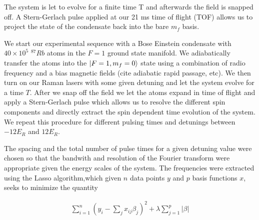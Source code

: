 The system is let to evolve for a finite time T and afterwards the field is snapped off. A Stern-Gerlach pulse applied at our 21 ms time of flight (TOF) allows us to project the state of the condensate back into the bare $m_f$ basis. 


We start our experimental sequence with a Bose Einstein condensate with $40\times 10^5$ $^{87}Rb$ atoms in the $F=1$ ground state manifold. We adiabatically transfer the atoms into the $|F=1,m_f=0\rangle$ state using a combination of radio frequency and a bias magnetic fields (cite adiabatic rapid passage, etc). We then turn on our Raman lasers with some given detuning and let the system evolve for a time $T$. After we snap off the field we let the atoms expand in time of flight and apply a Stern-Gerlach pulse which allows us to resolve the different spin components and directly extract the spin dependent time evolution of the system. We repeat this procedure for different pulsing times and detunings between $-12 E_R$ and $12 E_R$. 

The spacing and the total number of pulse times for a given detuning value were chosen so that the bandwith and resolution of the Fourier transform were appropriate given the energy scales of the system. The frequencies were extracted using the Lasso algorithm,which given $n$ data points $y$ and $p$ basis functions $x$, seeks to minimize the quantity

\begin{align}
	\sum_{i=1}^{n}(y_i-\sum_{j}x_{ij}\beta_j)^2+\lambda\sum_{j=1}^{p}\lvert\beta\rvert
\end{align}



